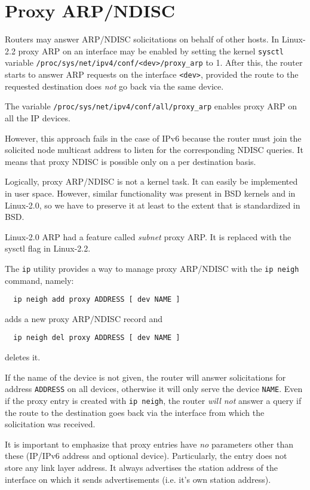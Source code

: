 \section{Proxy ARP/NDISC}
\label{PROXY-NEIGH}

Routers may answer ARP/NDISC solicitations on behalf of other hosts.
In Linux-2.2 proxy ARP on an interface may be enabled
by setting the kernel \verb|sysctl| variable 
\verb|/proc/sys/net/ipv4/conf/<dev>/proxy_arp| to 1. After this, the router
starts to answer ARP requests on the interface \verb|<dev>|, provided
the route to the requested destination does {\em not\/} go back via the same
device.

The variable \verb|/proc/sys/net/ipv4/conf/all/proxy_arp| enables proxy
ARP on all the IP devices.

However, this approach fails in the case of IPv6 because the router
must join the solicited node multicast address to listen for the corresponding
NDISC queries. It means that proxy NDISC is possible only on a per destination
basis.

Logically, proxy ARP/NDISC is not a kernel task. It can easily be implemented
in user space. However, similar functionality was present in BSD kernels
and in Linux-2.0, so we have to preserve it at least to the extent that
is standardized in BSD.
\begin{NB}
  Linux-2.0 ARP had a feature called {\em subnet\/} proxy ARP.
  It is replaced with the sysctl flag in Linux-2.2.
\end{NB}


The \verb|ip| utility provides a way to manage proxy ARP/NDISC
with the \verb|ip neigh| command, namely:
\begin{verbatim}
  ip neigh add proxy ADDRESS [ dev NAME ]
\end{verbatim}
adds a new proxy ARP/NDISC record and
\begin{verbatim}
  ip neigh del proxy ADDRESS [ dev NAME ]
\end{verbatim}
deletes it.

If the name of the device is not given, the router will answer solicitations
for address \verb|ADDRESS| on all devices, otherwise it will only serve
the device \verb|NAME|. Even if the proxy entry is created with
\verb|ip neigh|, the router {\em will not\/} answer a query if the route
to the destination goes back via the interface from which the solicitation
was received.

It is important to emphasize that proxy entries have {\em no\/}
parameters other than these (IP/IPv6 address and optional device).
Particularly, the entry does not store any link layer address.
It always advertises the station address of the interface
on which it sends advertisements (i.e. it's own station address).

